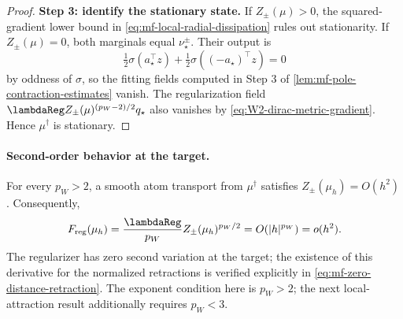 \begin{proof}
\par\noindent\textbf{Step 3: identify the stationary state.}
If \(Z_\pm(\mu)>0\), the squared-gradient lower bound in
\cref{eq:mf-local-radial-dissipation} rules out stationarity. If
\(Z_\pm(\mu)=0\), both marginals equal \(\nu_\star^\pm\). Their output is
\[
 \tfrac12\sigma(a_\star^\top z)+
 \tfrac12\sigma((-a_\star)^\top z)=0
\]
by oddness of \(\sigma\), so the fitting fields computed in Step 3 of
\cref{lem:mf-pole-contraction-estimates} vanish. The regularization field
\(\lambdaReg Z_\pm(\mu)^{(p_W-2)/2}q_\star\) also vanishes by
\cref{eq:W2-dirac-metric-gradient}. Hence \(\mu^\dagger\) is stationary.
\end{proof}

\paragraph{Second-order behavior at the target.}
For every \(p_W>2\), a smooth atom transport from \(\mu^\dagger\)
satisfies \(Z_\pm(\mu_h)=O(h^2)\). Consequently,
\[
 F_{\mathrm{reg}}(\mu_h)
 =\frac{\lambdaReg}{p_W}Z_\pm(\mu_h)^{p_W/2}
 =O(|h|^{p_W})=o(h^2).
\]
The regularizer has zero second variation at the target; the existence
of this derivative for the normalized retractions is verified explicitly
in \cref{eq:mf-zero-distance-retraction}. The exponent condition here is
\(p_W>2\); the next local-attraction result additionally requires \(p_W<3\).

